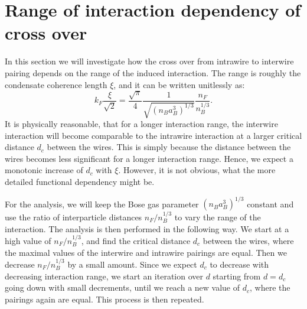 \section{Range of interaction dependency of cross over}
In this section we will investigate how the cross over from intrawire to interwire pairing depends on the range of the induced interaction. The range is roughly the condensate coherence length $\xi$, and it can be written unitlessly as:
\begin{equation}
k_F\frac{\xi}{\sqrt{2}} = \frac{\sqrt{\pi}}{4}\frac{1}{\sqrt{(n_Ba_B^3)^{1/3}}}\frac{n_F}{n_B^{1/3}}.
\end{equation}
It is physically reasonable, that for a longer interaction range, the interwire interaction will become comparable to the intrawire interaction at a larger critical distance $d_c$ between the wires. This is simply because the distance between the wires becomes less significant for a longer interaction range. Hence, we expect a monotonic increase of $d_c$ with $\xi$. However, it is not obvious, what the more detailed functional dependency might be.  

For the analysis, we will keep the Bose gas parameter $(n_Ba_B^3)^{1/3}$ constant and use the ratio of interparticle distances $n_F/n_B^{1/3}$ to vary the range of the interaction. The analysis is then performed in the following way. We start at a high value of $n_F/n_B^{1/3}$, and find the critical distance $d_c$ between the wires, where the maximal values of the interwire and intrawire pairings are equal. Then we decrease $n_F/n_B^{1/3}$ by a small amount. Since we expect $d_c$ to decrease with decreasing interaction range, we start an iteration over $d$ starting from $d = d_c$ going down with small decrements, until we reach a new value of $d_c$, where the pairings again are equal. This process is then repeated.

